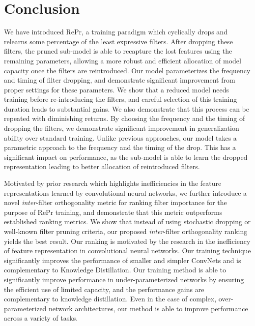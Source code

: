 \section{Conclusion} \label{sec:conclusion}
We have introduced RePr, a training paradigm which cyclically drops and relearns some percentage of the least expressive filters.
After dropping these filters, the pruned sub-model is able to recapture the lost features using the remaining parameters, allowing a more robust and efficient allocation of model capacity once the filters are reintroduced.
Our model parameterizes the frequency and timing of filter dropping, and demonstrate significant improvement from proper settings for these parameters.
We show that a reduced model needs training before re-introducing the filters, and careful selection of this training duration leads to substantial gains. 
We also demonstrate that this process can be repeated with diminishing returns.
By choosing the frequency and the timing of dropping the filters, we demonstrate significant improvement in generalization ability over standard training.
Unlike previous approaches, our model takes a parametric approach to the frequency and the timing of the drop. 
This has a significant impact on performance, as the sub-model is able to learn the dropped representation leading to better allocation of reintroduced filters.

Motivated by prior research which highlights inefficiencies in the feature representations learned by convolutional neural networks, we further introduce a novel \textit{inter}-filter orthogonality metric for ranking filter importance for the purpose of RePr training, and demonstrate that this metric outperforms established ranking metrics.
We show that instead of using stochastic dropping or well-known filter pruning criteria, our proposed \textit{inter}-filter orthogonality ranking yields the best result. 
Our ranking is motivated by the research in the inefficiency of feature representation in convolutional neural networks.
Our training technique significantly improves the performance of smaller and simpler ConvNets and is complementary to Knowledge Distillation.
Our training method is able to significantly improve performance in under-parameterized networks by ensuring the efficient use of limited capacity, and the performance gains are complementary to knowledge distillation.
Even in the case of complex, over-parameterized network architectures, our method is able to improve performance across a variety of tasks.
